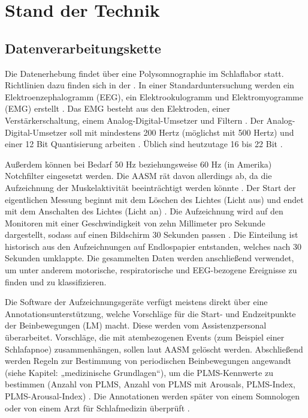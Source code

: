 
\chapter{Stand der Technik}\label{chap:Stand_der_Technik}
\section{Datenverarbeitungskette}

Die Datenerhebung findet über eine Polysomnographie im Schlaflabor statt. Richtlinien dazu finden sich in der \cite{AASM}. In einer Standarduntersuchung werden ein Elektroenzephalogramm (EEG), ein Elektrookulogramm und Elektromyogramme (EMG) erstellt \cite{1x1}. Das EMG besteht aus den Elektroden, einer Verstärkerschaltung, einem Analog-Digital-Umsetzer und Filtern \cite{biomechanist} \cite{PRT}. Der Analog-Digital-Umsetzer soll mit mindestens 200 Hertz (möglichst mit 500 Hertz) und einer 12 Bit Quantisierung arbeiten \cite{AASM}. Üblich sind heutzutage 16 bis 22 Bit \cite{SleepDisordersMedicine}.

Außerdem können bei Bedarf 50 Hz beziehungsweise 60 Hz (in Amerika) Notchfilter eingesetzt werden. Die AASM rät davon allerdings ab, da die Aufzeichnung der Muskelaktivität beeinträchtigt werden könnte \cite{PRT}.
Der Start der eigentlichen Messung beginnt mit dem Löschen des Lichtes (Licht aus) und endet mit dem Anschalten des Lichtes (Licht an) \cite{1x1}. Die Aufzeichnung wird auf den Monitoren mit einer Geschwindigkeit von zehn Millimeter pro Sekunde dargestellt, sodass auf einen Bildschirm 30 Sekunden passen \cite{PRT}. Die Einteilung ist historisch aus den Aufzeichnungen auf Endlospapier entstanden, welches nach 30 Sekunden umklappte. Die gesammelten Daten werden anschließend verwendet, um unter anderem motorische, respiratorische und EEG-bezogene Ereignisse zu finden und zu klassifizieren. \cite{PDS}

Die Software der Aufzeichnungsgeräte verfügt meistens direkt über eine Annotationsunterstützung, welche Vorschläge für die Start- und Endzeitpunkte der Beinbewegungen (LM) macht. Diese werden vom Assistenzpersonal überarbeitet. Vorschläge, die mit atembezogenen Events (zum Beispiel einer Schlafapnoe) zusammenhängen, sollen laut AASM gelöscht werden. Abschließend werden Regeln zur Bestimmung von periodischen Beinbewegungen angewandt (siehe Kapitel: „medizinische Grundlagen“), um die PLMS-Kennwerte zu bestimmen (Anzahl von PLMS, Anzahl von PLMS mit Arousals, PLMS-Index, PLMS-Arousal-Index) \cite{Carvelli}. Die Annotationen werden später von einem Somnologen oder von einem Arzt für Schlafmedizin überprüft \cite{PDS}. \cite{PRT}

